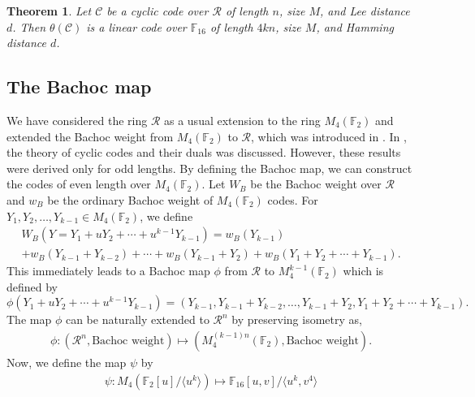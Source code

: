 \documentclass{amsart}
\newtheorem{theorem}{Theorem}[section]
\theoremstyle{definition}
\theoremstyle{remark}
\numberwithin{equation}{section}
\begin{document}
    \begin{theorem}
    Let $\mathcal{C}$ be a cyclic code over $\mathcal{R}$ of length $n$, size $M$, and Lee         distance $d$. Then $\theta(\mathcal{C})$ is a linear code over $\mathbb F_{16}$ of length      $4kn$, size $M$, and Hamming distance $d$.
\end{theorem}
\subsection{The Bachoc map}
 We have considered the ring $\mathcal{R}$ as a usual extension to the ring $ M_4(\mathbb{F}_2) $ and extended the Bachoc weight from $ M_4(\mathbb{F}_2) $ to $\mathcal{R}$, which was introduced in \cite{A}. In \cite{Pal}, the theory of cyclic codes and their duals was discussed. However, these results were derived only for odd lengths. By defining the Bachoc map, we can construct the codes of even length over $ M_4(\mathbb{F}_2) $. Let $W_B$ be the Bachoc weight over $\mathcal{R}$ and $w_B$ be the ordinary Bachoc weight of $M_4(\mathbb F_2)$ codes. For $Y_1,Y_2,\dots,Y_{k-1}\in M_4(\mathbb F_2)$, we define
\begin{gather*}	W_B(Y=Y_1+uY_2+\cdots+u^{k-1}Y_{k-1}) = w_B(Y_{k-1}) \\ +w_B(Y_{k-1}+Y_{k-2})+\cdots+w_B(Y_{k-1}+Y_{2})+w_B(Y_{1}+Y_{2}+\cdots+Y_{k-1}).\end{gather*} This immediately leads to a Bachoc map $\phi$ from $\mathcal{R}$ to $M_4^{k-1}(\mathbb F_2)$ which is defined by
	$$\phi(Y_1+uY_2+\cdots+u^{k-1}Y_{k-1})=(Y_{k-1},Y_{k-1}+Y_{k-2},\dots,Y_{k-1}+Y_{2},Y_{1}+Y_{2}+\cdots+Y_{k-1} ).$$ The map $\phi$ can be naturally extended to $\mathcal{R}^n$ by preserving isometry as,
	\begin{gather*}
	   \phi: (\mathcal{R}^n, \text{Bachoc weight})\mapsto (M_4^{(k-1)n}(\mathbb F_2), \text{Bachoc weight}).\end{gather*}
       Now, we define the map $\psi$ by
       \begin{gather*}
       \psi:M_4(\mathbb F_2[u]/ \langle u^k \rangle) \mapsto \mathbb F_{16}[u,v]/\langle u^k,v^4\rangle
       \end{gather*}
\end{document}
